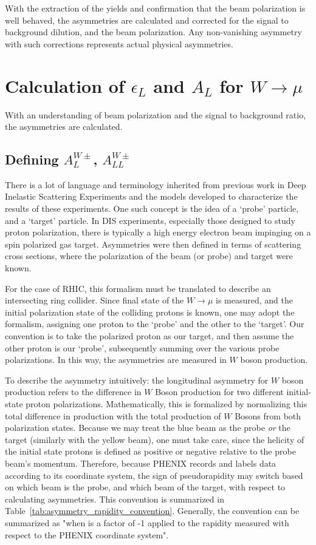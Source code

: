 With the extraction of the yields and confirmation that the beam polarization is
well behaved, the asymmetries are calculated and corrected for the signal to
background dilution, and the beam polarization. Any non-vanishing asymmetry with
such corrections represents actual physical asymmetries.

\clearpage
\section{Calculation of $\epsilon_L$ and $A_{L}$ for $W\rightarrow\mu$}

With an understanding of beam polarization and the signal to background ratio,
the asymmetries are calculated. 

\subsection{Defining $A_L^{W\pm}$, $A_{LL}^{W\pm}$}
\label{sec:calculate_al}

There is a lot of language and terminology inherited from previous work in Deep
Inelastic Scattering Experiments and the models developed to characterize the
results of these experiments. One such concept is the idea of a `probe'
particle, and a `target' particle. In DIS experiments, especially those designed
to study proton polarization, there is typically a high energy electron beam
impinging on a spin polarized gas target. Asymmetries were then defined in terms
of scattering cross sections, where the polarization of the beam (or probe) and
target were known.

For the case of RHIC, this formalism must be translated to describe an
intersecting ring collider. Since final state of the $W\rightarrow\mu$ is
measured, and the initial polarization state of the colliding protons is known,
one may adopt the formalism, assigning one proton to the `probe' and the other
to the `target'.  Our convention is to take the polarized proton as our target,
and then assume the other proton is our `probe', subsequently summing over the
various probe polarizations. In this way, the asymmetries are measured in $W$
boson production.

To describe the asymmetry intuitively: the longitudinal asymmetry for $W$ boson
production refers to the difference in $W$ Boson production for two different
initial-state proton polarizations.  Mathematically, this is formalized by
normalizing this total difference in production with the total production of $W$
Bosons from both polarization states. Because we may treat the blue beam as the
probe \textit{or} the target (similarly with the yellow beam), one must take
care, since the helicity of the initial state protons is defined as positive or
negative relative to the probe beam's momentum. Therefore, because PHENIX
records and labels data according to its coordinate system, the sign of
pseudorapidity may switch based on which beam is the probe, and which beam of
the target, with respect to calculating asymmetries. This convention is
summarized in Table~\ref{tab:asymmetry_rapidity_convention}. Generally, the
convention can be summarized as "when is a factor of -1 applied to the rapidity
measured with respect to the PHENIX coordinate system".


